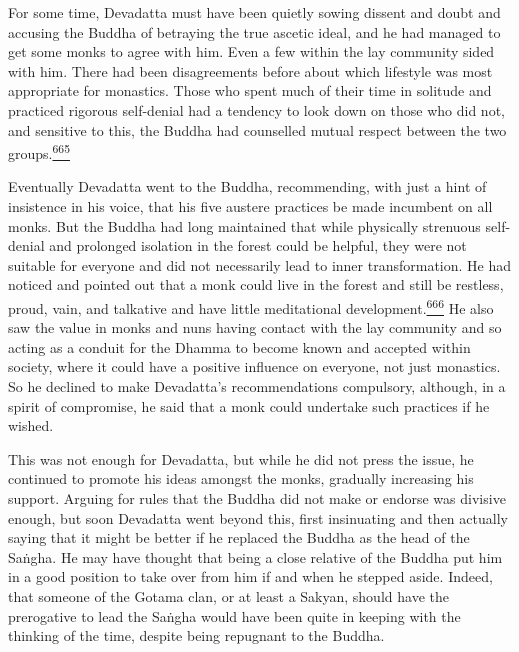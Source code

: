 For some time, Devadatta must have been quietly sowing dissent and doubt
and accusing the Buddha of betraying the true ascetic ideal, and he had
managed to get some monks to agree with him. Even a few within the lay
community sided with him. There had been disagreements before about
which lifestyle was most appropriate for monastics. Those who spent much
of their time in solitude and practiced rigorous self-denial had a
tendency to look down on those who did not, and sensitive to this, the
Buddha had counselled mutual respect between the two
groups.\label{footprints_split_016.html_fnref665}\hyperref[footprints_split_025.htmlux5cux23fn665]{\textsuperscript{665}}

Eventually Devadatta went to the Buddha, recommending, with just a hint
of insistence in his voice, that his five austere practices be made
incumbent on all monks. But the Buddha had long maintained that while
physically strenuous self-denial and prolonged isolation in the forest
could be helpful, they were not suitable for everyone and did not
necessarily lead to inner transformation. He had noticed and pointed out
that a monk could live in the forest and still be restless, proud, vain,
and talkative and have little meditational
development.\label{footprints_split_016.html_fnref666}\hyperref[footprints_split_025.htmlux5cux23fn666]{\textsuperscript{666}}
He also saw the value in monks and nuns having contact with the lay
community and so acting as a conduit for the Dhamma to become known and
accepted within society, where it could have a positive influence on
everyone, not just monastics. So he declined to make Devadatta's
recommendations compulsory, although, in a spirit of compromise, he said
that a monk could undertake such practices if he wished.

This was not enough for Devadatta, but while he did not press the issue,
he continued to promote his ideas amongst the monks, gradually
increasing his support. Arguing for rules that the Buddha did not make
or endorse was divisive enough, but soon Devadatta went beyond this,
first insinuating and then actually saying that it might be better if he
replaced the Buddha as the head of the Saṅgha. He may have thought that
being a close relative of the Buddha put him in a good position to take
over from him if and when he stepped aside. Indeed, that someone of the
Gotama clan, or at least a Sakyan, should have the prerogative to lead
the Saṅgha would have been quite in keeping with the thinking of the
time, despite being repugnant to the Buddha.

